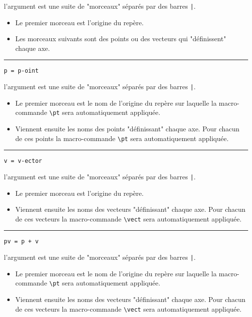 \documentclass[12pt,a4paper]{article}
\newcommand\env[1]{\texttt{#1}}
\newcommand\macro[1]{\env{\textbackslash{}#1}}
\theoremstyle{definition}
\newcommand\separation{
	\medskip
	\hfill\rule{0.5\textwidth}{0.75pt}\hfill
	\medskip
}
\newcommand\mwhyprefix[2]{%
	\texttt{#1 = #1-#2}%
}
\newcommand\prefix[1]{%
	\texttt{#1}%
}
\begin{document}
\IDarg{} l'argument est une suite de "morceaux" séparés par des barres \verb+|+.

\begin{itemize}[topsep=0pt]
	\item Le premier morceau est l'origine du repère.

	\item Les morceaux suivants sont des points ou des vecteurs qui "définissent" chaque axe.
\end{itemize}


\separation

 \hfill \mwhyprefix{p}{oint}

\IDarg{} l'argument est une suite de "morceaux" séparés par des barres \verb+|+.

\begin{itemize}[topsep=0pt]
	\item Le premier morceau est le nom de l'origine du repère sur laquelle la macro-commande \macro{pt} sera automatiquement appliquée.

	\item Viennent ensuite les noms des points "définissant" chaque axe. Pour chacun de ces points la macro-commande \macro{pt} sera automatiquement appliquée.
\end{itemize}


\separation

 \hfill \mwhyprefix{v}{ector}

\IDarg{} l'argument est une suite de "morceaux" séparés par des barres \verb+|+.

\begin{itemize}[topsep=0pt]
	\item Le premier morceau est l'origine du repère.

	\item Viennent ensuite les noms des vecteurs "définissant" chaque axe. Pour chacun de ces vecteurs la macro-commande \macro{vect} sera automatiquement appliquée.
\end{itemize}


\separation

 \hfill \prefix{pv = p + v}

\IDarg{} l'argument est une suite de "morceaux" séparés par des barres \verb+|+.

\begin{itemize}[topsep=0pt]
	\item Le premier morceau est le nom de l'origine du repère sur laquelle la macro-commande \macro{pt} sera automatiquement appliquée.

	\item Viennent ensuite les noms des vecteurs "définissant" chaque axe. Pour chacun de ces vecteurs la macro-commande \macro{vect} sera automatiquement appliquée.
\end{itemize}
\end{document}
